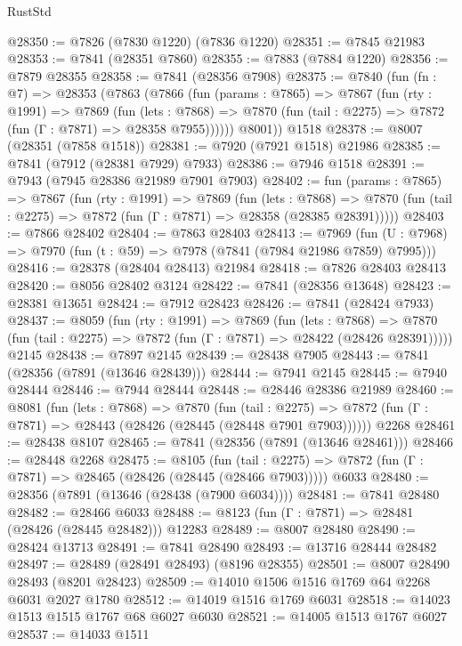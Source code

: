 \begin{lexlean}{RustStd}
\begin{coremodule}
{\begin{coremodule}
{{{{{{{{{{{{{{{{{{{{{{{{{{{{{{{{{{{{{{{{{{{{{{{{{{{{{{@28350 := @7826 (@7830 @1220) (@7836 @1220)
@28351 := @7845 @21983
@28353 := @7841 (@28351 @7860)
@28355 := @7883 (@7884 @1220)
@28356 := @7879 @28355
@28358 := @7841 (@28356 @7908)
@28375 := @7840
    (fun (fn : @7) =>
    @28353
      (@7863
        (@7866
          (fun (params : @7865) =>
          @7867
            (fun (rty : @1991) =>
            @7869
              (fun (lets : @7868) =>
              @7870 (fun (tail : @2275) => @7872 (fun (Γ : @7871) => @28358 @7955))))))
        @8001))
    @1518
@28378 := @8007 (@28351 (@7858 @1518))
@28381 := @7920 (@7921 @1518) @21986
@28385 := @7841 (@7912 (@28381 @7929) @7933)
@28386 := @7946 @1518
@28391 := @7943 (@7945 @28386 @21989 @7901 @7903)
@28402 := fun (params : @7865) =>
  @7867
    (fun (rty : @1991) =>
    @7869
      (fun (lets : @7868) =>
      @7870 (fun (tail : @2275) => @7872 (fun (Γ : @7871) => @28358 (@28385 @28391)))))
@28403 := @7866 @28402
@28404 := @7863 @28403
@28413 := @7969
    (fun (U : @7968) => @7970 (fun (t : @59) => @7978 (@7841 (@7984 @21986 @7859) @7995)))
@28416 := @28378 (@28404 @28413) @21984
@28418 := @7826 @28403 @28413
@28420 := @8056 @28402 @3124
@28422 := @7841 (@28356 @13648)
@28423 := @28381 @13651
@28424 := @7912 @28423
@28426 := @7841 (@28424 @7933)
@28437 := @8059
    (fun (rty : @1991) =>
    @7869
      (fun (lets : @7868) =>
      @7870 (fun (tail : @2275) => @7872 (fun (Γ : @7871) => @28422 (@28426 @28391)))))
    @2145
@28438 := @7897 @2145
@28439 := @28438 @7905
@28443 := @7841 (@28356 (@7891 (@13646 @28439)))
@28444 := @7941 @2145
@28445 := @7940 @28444
@28446 := @7944 @28444
@28448 := @28446 @28386 @21989
@28460 := @8081
    (fun (lets : @7868) =>
    @7870
      (fun (tail : @2275) =>
      @7872 (fun (Γ : @7871) => @28443 (@28426 (@28445 (@28448 @7901 @7903))))))
    @2268
@28461 := @28438 @8107
@28465 := @7841 (@28356 (@7891 (@13646 @28461)))
@28466 := @28448 @2268
@28475 := @8105
    (fun (tail : @2275) => @7872 (fun (Γ : @7871) => @28465 (@28426 (@28445 (@28466 @7903)))))
    @6033
@28480 := @28356 (@7891 (@13646 (@28438 (@7900 @6034))))
@28481 := @7841 @28480
@28482 := @28466 @6033
@28488 := @8123 (fun (Γ : @7871) => @28481 (@28426 (@28445 @28482))) @12283
@28489 := @8007 @28480
@28490 := @28424 @13713
@28491 := @7841 @28490
@28493 := @13716 @28444 @28482
@28497 := @28489 (@28491 @28493) (@8196 @28355)
@28501 := @8007 @28490 @28493 (@8201 @28423)
@28509 := @14010 @1506 @1516 @1769 @64 @2268 @6031 @2027 @1780
@28512 := @14019 @1516 @1769 @6031
@28518 := @14023 @1513 @1515 @1767 @68 @6027 @6030
@28521 := @14005 @1513 @1767 @6027
@28537 := @14033
    @1511
}}}}}}}}}}}}}}}}}}}}}}}}}}}}}}}}}}}}}}}}}}}}}}}}}}}}}}
\end{coremodule}}
\end{coremodule}
\end{lexlean}
